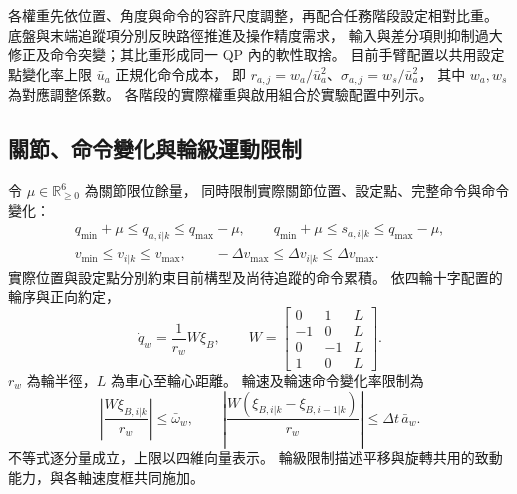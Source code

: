 各權重先依位置、角度與命令的容許尺度調整，再配合任務階段設定相對比重。
底盤與末端追蹤項分別反映路徑推進及操作精度需求，
輸入與差分項則抑制過大修正及命令突變；其比重形成同一 QP 內的軟性取捨。
目前手臂配置以共用設定點變化率上限 $\bar u_a$ 正規化命令成本，
即 $r_{a,j}=w_a/\bar u_a^2$、$\sigma_{a,j}=w_s/\bar u_a^2$，
其中 $w_a,w_s$ 為對應調整係數。
各階段的實際權重與啟用組合於實驗配置中列示。

\subsection{關節、命令變化與輪級運動限制}
\label{subsec:joint_command_wheel_constraints}

令 $\mu\in\mathbb R_{\geq0}^6$ 為關節限位餘量，
同時限制實際關節位置、設定點、完整命令與命令變化：
\begin{equation}
    \begin{gathered}
        q_{\min}+\mu\leq q_{a,i|k}\leq q_{\max}-\mu,\qquad
        q_{\min}+\mu\leq s_{a,i|k}\leq q_{\max}-\mu,\\
        v_{\min}\leq v_{i|k}\leq v_{\max},\qquad
        -\Delta v_{\max}\leq\Delta v_{i|k}\leq\Delta v_{\max}.
    \end{gathered}
    \label{eq:ch3_joint_command_limits}
\end{equation}
實際位置與設定點分別約束目前構型及尚待追蹤的命令累積。
依四輪十字配置的輪序與正向約定，
\begin{equation}
    \dot q_w=\frac{1}{r_w}W\xi_B,\qquad
    W=
    \begin{bmatrix}
        0&1&L\\-1&0&L\\0&-1&L\\1&0&L
    \end{bmatrix}.
    \label{eq:ch3_wheel_command_mapping}
\end{equation}
$r_w$ 為輪半徑，$L$ 為車心至輪心距離。
輪速及輪速命令變化率限制為
\begin{equation}
    \left|\frac{W\xi_{B,i|k}}{r_w}\right|\leq\bar\omega_w,\qquad
    \left|\frac{W(\xi_{B,i|k}-\xi_{B,i-1|k})}{r_w}\right|
    \leq\Delta t\,\bar a_w .
    \label{eq:ch3_wheel_speed_acceleration_limits}
\end{equation}
不等式逐分量成立，上限以四維向量表示。
輪級限制描述平移與旋轉共用的致動能力，與各軸速度框共同施加。

